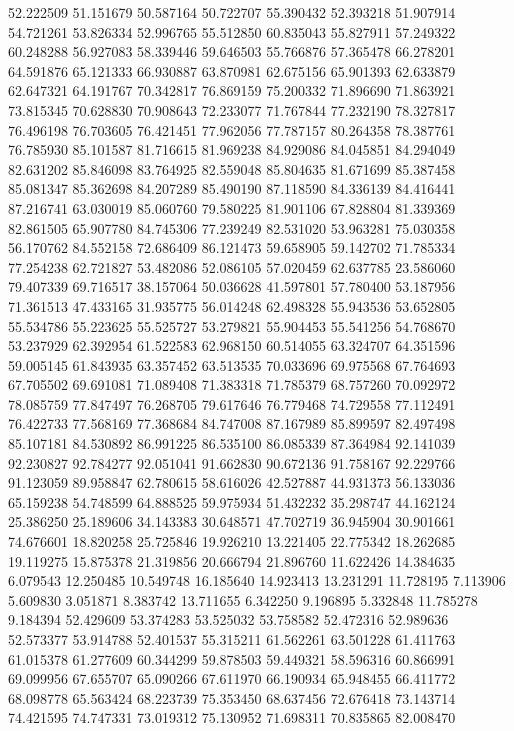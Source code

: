 52.222509
51.151679
50.587164
50.722707
55.390432
52.393218
51.907914
54.721261
53.826334
52.996765
55.512850
60.835043
55.827911
57.249322
60.248288
56.927083
58.339446
59.646503
55.766876
57.365478
66.278201
64.591876
65.121333
66.930887
63.870981
62.675156
65.901393
62.633879
62.647321
64.191767
70.342817
76.869159
75.200332
71.896690
71.863921
73.815345
70.628830
70.908643
72.233077
71.767844
77.232190
78.327817
76.496198
76.703605
76.421451
77.962056
77.787157
80.264358
78.387761
76.785930
85.101587
81.716615
81.969238
84.929086
84.045851
84.294049
82.631202
85.846098
83.764925
82.559048
85.804635
81.671699
85.387458
85.081347
85.362698
84.207289
85.490190
87.118590
84.336139
84.416441
87.216741
63.030019
85.060760
79.580225
81.901106
67.828804
81.339369
82.861505
65.907780
84.745306
77.239249
82.531020
53.963281
75.030358
56.170762
84.552158
72.686409
86.121473
59.658905
59.142702
71.785334
77.254238
62.721827
53.482086
52.086105
57.020459
62.637785
23.586060
79.407339
69.716517
38.157064
50.036628
41.597801
57.780400
53.187956
71.361513
47.433165
31.935775
56.014248
62.498328
55.943536
53.652805
55.534786
55.223625
55.525727
53.279821
55.904453
55.541256
54.768670
53.237929
62.392954
61.522583
62.968150
60.514055
63.324707
64.351596
59.005145
61.843935
63.357452
63.513535
70.033696
69.975568
67.764693
67.705502
69.691081
71.089408
71.383318
71.785379
68.757260
70.092972
78.085759
77.847497
76.268705
79.617646
76.779468
74.729558
77.112491
76.422733
77.568169
77.368684
84.747008
87.167989
85.899597
82.497498
85.107181
84.530892
86.991225
86.535100
86.085339
87.364984
92.141039
92.230827
92.784277
92.051041
91.662830
90.672136
91.758167
92.229766
91.123059
89.958847
62.780615
58.616026
42.527887
44.931373
56.133036
65.159238
54.748599
64.888525
59.975934
51.432232
35.298747
44.162124
25.386250
25.189606
34.143383
30.648571
47.702719
36.945904
30.901661
74.676601
18.820258
25.725846
19.926210
13.221405
22.775342
18.262685
19.119275
15.875378
21.319856
20.666794
21.896760
11.622426
14.384635
6.079543
12.250485
10.549748
16.185640
14.923413
13.231291
11.728195
7.113906
5.609830
3.051871
8.383742
13.711655
6.342250
9.196895
5.332848
11.785278
9.184394
52.429609
53.374283
53.525032
53.758582
52.472316
52.989636
52.573377
53.914788
52.401537
55.315211
61.562261
63.501228
61.411763
61.015378
61.277609
60.344299
59.878503
59.449321
58.596316
60.866991
69.099956
67.655707
65.090266
67.611970
66.190934
65.948455
66.411772
68.098778
65.563424
68.223739
75.353450
68.637456
72.676418
73.143714
74.421595
74.747331
73.019312
75.130952
71.698311
70.835865
82.008470
